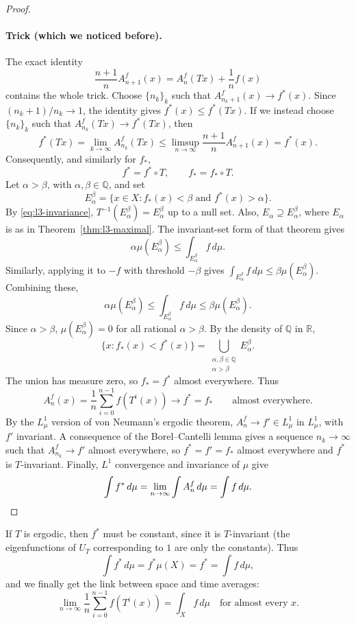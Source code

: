 \documentclass[11pt,a4paper]{article}
\begin{document}
\begin{proof}
\paragraph{Trick (which we noticed before).}
The exact identity
\[
 \frac{n+1}{n}A_{n+1}^f(x)
 =A_n^f(Tx)+\frac1nf(x)
\]
contains the whole trick. Choose $\{n_k\}_k$ such that
$A_{n_k+1}^f(x)\to f^*(x)$. Since $(n_k+1)/n_k\to1$, the identity gives
$f^*(x)\leq f^*(Tx)$. If we instead choose $\{n_k\}_k$ such that
$A_{n_k}^f(Tx)\to f^*(Tx)$, then
\[
 f^*(Tx)=\lim_{k\to\infty}A_{n_k}^f(Tx)
 \leq\limsup_{n\to\infty}\frac{n+1}{n}A_{n+1}^f(x)=f^*(x).
\]
Consequently, and similarly for $f_*$,
\begin{equation}
 f^*=f^*\circ T,\qquad f_*=f_*\circ T.
 \tag{$*$}\label{eq:l3-invariance}
\end{equation}
Let $\alpha>\beta$, with $\alpha,\beta\in\mathbb Q$, and set
\[
 E_\alpha^\beta=\{x\in X:f_*(x)<\beta\text{ and }f^*(x)>\alpha\}.
\]
By \eqref{eq:l3-invariance}, $T^{-1}(E_\alpha^\beta)=E_\alpha^\beta$ up to a
null set. Also, $E_\alpha\supseteq E_\alpha^\beta$, where $E_\alpha$ is as in
Theorem~\ref{thm:l3-maximal}. The invariant-set form of that theorem gives
\[
 \alpha\mu(E_\alpha^\beta)
 \leq\int_{E_\alpha^\beta}f\,d\mu.
\]
Similarly, applying it to $-f$ with threshold $-\beta$ gives
$\int_{E_\alpha^\beta}f\,d\mu\leq\beta\mu(E_\alpha^\beta)$.
Combining these,
\[
 \alpha\mu(E_\alpha^\beta)
 \leq\int_{E_\alpha^\beta}f\,d\mu
 \leq\beta\mu(E_\alpha^\beta).
\]
Since $\alpha>\beta$, $\mu(E_\alpha^\beta)=0$ for all rational
$\alpha>\beta$. By the density of $\mathbb Q$ in $\mathbb R$,
\[
 \{x:f_*(x)<f^*(x)\}
 =\bigcup_{\substack{\alpha,\beta\in\mathbb Q\\\alpha>\beta}}E_\alpha^\beta.
\]
The union has measure zero, so $f_*=f^*$ almost everywhere. Thus
\[
 A_n^f(x)=\frac1n\sum_{i=0}^{n-1}f(T^i(x))\longrightarrow f^*=f_*
 \qquad\text{almost everywhere.}
\]
By the $L^1_\mu$ version of von Neumann's ergodic theorem,
$A_n^f\to f'\in L^1_\mu$ in $L^1_\mu$, with $f'$ invariant. A consequence of
the Borel--Cantelli lemma gives a sequence $n_k\to\infty$ such that
$A_{n_k}^f\to f'$ almost everywhere, so $f^*=f'=f_*$ almost everywhere and
$f^*$ is $T$-invariant. Finally, $L^1$ convergence and invariance of $\mu$
give
\[
 \int f^*\,d\mu=\lim_{n\to\infty}\int A_n^f\,d\mu=\int f\,d\mu.\qedhere
\]
\end{proof}



\begin{remark}
If $T$ is ergodic, then $f^*$ must be constant, since it is $T$-invariant
(the eigenfunctions of $U_T$ corresponding to $1$ are only the constants).
Thus
\[
 \int f^*\,d\mu=f^*\mu(X)=f^*=\int f\,d\mu,
\]
and we finally get the link between space and time averages:
\[
 \boxed{\lim_{n\to\infty}\frac1n\sum_{i=0}^{n-1}f(T^i(x))
 =\int_Xf\,d\mu\quad\text{for almost every }x.}
\]
\end{remark}
\end{document}
